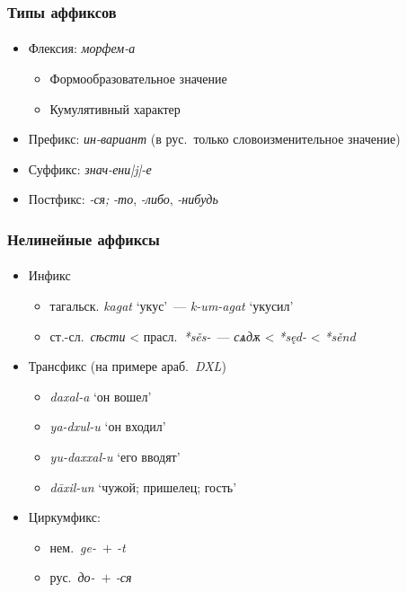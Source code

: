 \begin{frame}
    \frametitle{Типы аффиксов}
    \framesubtitle{\autocite[14--15]{zubova_menshikova:2014}}

    \begin{itemize}
        \item Флексия: \textit{морфем-а} \begin{itemize}
            \item Формообразовательное значение
            \item Кумулятивный характер
        \end{itemize}
        \item Префикс: \textit{ин-вариант} (в рус.\ только словоизменительное значение)
        \item Суффикс: \textit{знач-ени|j|-е}
        \item Постфикс: \textit{-ся;} \textit{-то}, \textit{-либо}, \textit{-нибудь}
    \end{itemize}
\end{frame}

\begin{frame}
    \frametitle{Нелинейные аффиксы}
    \framesubtitle{\autocite[91--97]{plungyan:2003}}

    \begin{itemize}
        \item Инфикс \begin{itemize}
            \item тагальск. \textit{kagat} `укус'~--- \textit{k-um-agat} `укусил'
            \item ст.-сл.\ \textit{сѣсти} < прасл.\ \textit{*sěs-}~--- \textit{сѧдѫ} < \textit{*sęd-} < \textit{*sěnd}
        \end{itemize}
        \item<2-> Трансфикс (на примере араб.\ \textit{DXL}) \begin{itemize}
            \item \textit{daxal-a} `он вошел'
            \item \textit{ya-dxul-u} `он входил'
            \item \textit{yu-daxxal-u} `его вводят'
            \item \textit{dāxil-un} `чужой; пришелец; гость'
        \end{itemize}
        \item<3-> Циркумфикс: \begin{itemize}
            \item нем.\ \textit{ge-~$+$ -t}
            \item рус.\ \textit{до-~$+$ -ся}
        \end{itemize}
    \end{itemize}
\end{frame}

